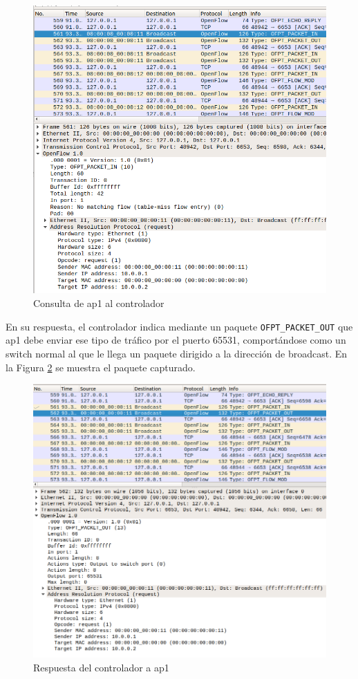 \documentclass[a4paper,12pt,twoside,spanish]{book}
\begin{document}
	\begin{figure}[!h]
		\centering
		\includegraphics[scale=0.4]{Figuras/capt_1.png}
		\caption{Consulta de ap1 al controlador}
		\label{fig:capt_1}
	\end{figure}

En su respuesta, el controlador indica mediante un paquete \texttt{OFPT\_PACKET\_OUT} que ap1 debe enviar ese tipo de tráfico por el puerto 65531, comportándose como un switch normal al que le llega un paquete dirigido a la dirección de broadcast. En la Figura \ref{fig:capt_2} se muestra el paquete capturado.\par

	\begin{figure}[!h]
		\centering
		\includegraphics[scale=0.4]{Figuras/capt_2.png}
		\caption{Respuesta del controlador a ap1}
		\label{fig:capt_2}
	\end{figure}
\end{document}
